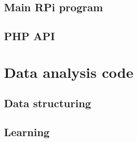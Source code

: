 \documentclass[11pt]{report}
\begin{document}
\section{Main RPi program} \label{code:main_program}



\section{PHP API} \label{php_api}



%
%
%
%
%
%


\chapter{Data analysis code}

\section{Data structuring}

\section{Learning}
\end{document}
